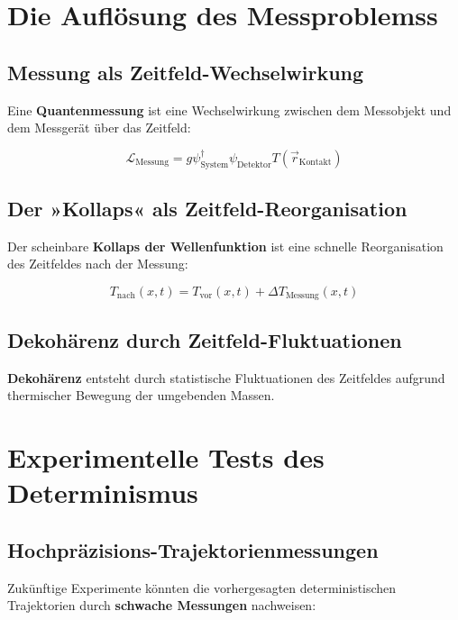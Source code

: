 \documentclass[12pt,a4paper]{report}
\begin{document}
	\section{Die Auflösung des Messproblemss}
	
	\subsection{Messung als Zeitfeld-Wechselwirkung}
	
	Eine \textbf{Quantenmessung} ist eine Wechselwirkung zwischen dem Messobjekt und dem Messgerät über das Zeitfeld:
	
	\begin{equation}
		\mathcal{L}_{\text{Messung}} = g \psi_{\text{System}}^\dagger \psi_{\text{Detektor}} T(\vec{r}_{\text{Kontakt}})
	\end{equation}
	
	\subsection{Der »Kollaps« als Zeitfeld-Reorganisation}
	
	Der scheinbare \textbf{Kollaps der Wellenfunktion} ist eine schnelle Reorganisation des Zeitfeldes nach der Messung:
	
	\begin{equation}
		T_{\text{nach}}(x,t) = T_{\text{vor}}(x,t) + \Delta T_{\text{Messung}}(x,t)
	\end{equation}
	
	\subsection{Dekohärenz durch Zeitfeld-Fluktuationen}
	
	\textbf{Dekohärenz} entsteht durch statistische Fluktuationen des Zeitfeldes aufgrund thermischer Bewegung der umgebenden Massen.
	
	\section{Experimentelle Tests des Determinismus}
	
	\subsection{Hochpräzisions-Trajektorienmessungen}
	
	Zukünftige Experimente könnten die vorhergesagten deterministischen Trajektorien durch \textbf{schwache Messungen} nachweisen:
	
\end{document}
